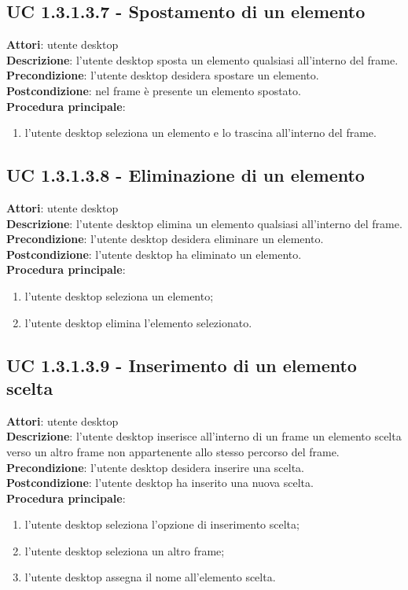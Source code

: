 \subsection{UC 1.3.1.3.7 - Spostamento di un elemento}{
	\label{uc1.3.1.3.7}
	\textbf{Attori}: utente desktop \\
	\textbf{Descrizione}: l'utente desktop sposta un elemento qualsiasi all'interno del frame. \\
	\textbf{Precondizione}: l'utente desktop desidera spostare un elemento.	\\
	\textbf{Postcondizione}: nel frame è presente un elemento spostato.	\\
	\textbf{Procedura principale}:
	\begin{enumerate}
		\item l'utente desktop seleziona un elemento e lo trascina all'interno del frame.
	\end{enumerate}
	}
\subsection{UC 1.3.1.3.8 - Eliminazione di un elemento}{
	\label{uc1.3.1.3.8}
	\textbf{Attori}: utente desktop \\
	\textbf{Descrizione}: l'utente desktop elimina un elemento qualsiasi all'interno del frame. \\
	\textbf{Precondizione}: l'utente desktop desidera eliminare un elemento.	\\
	\textbf{Postcondizione}: l'utente desktop ha eliminato un elemento.	\\
	\textbf{Procedura principale}:
	\begin{enumerate}
		\item l'utente desktop seleziona un elemento;
		\item l'utente desktop elimina l'elemento selezionato.
	\end{enumerate}
	}
\subsection{UC 1.3.1.3.9 - Inserimento di un elemento scelta}{
	\label{uc1.3.1.3.9}
	\textbf{Attori}: utente desktop \\
	\textbf{Descrizione}: l'utente desktop inserisce all'interno di un frame un elemento scelta verso un altro frame non appartenente allo stesso percorso del frame. \\
	\textbf{Precondizione}: l'utente desktop desidera inserire una scelta.	\\
	\textbf{Postcondizione}: l'utente desktop ha inserito una nuova scelta.	\\
	\textbf{Procedura principale}:
	\begin{enumerate}
		\item l'utente desktop seleziona l'opzione di inserimento scelta;
		\item l'utente desktop seleziona un altro frame;
		\item l'utente desktop assegna il nome all'elemento scelta.
	\end{enumerate}
	}
